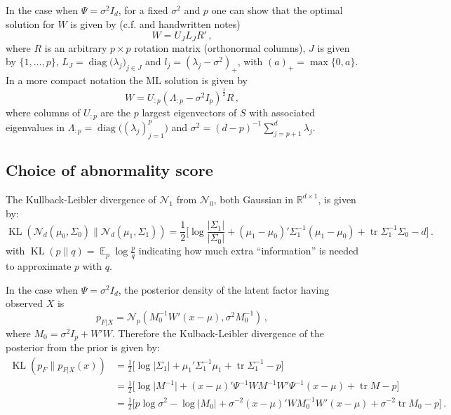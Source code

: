 \documentclass[a4paper,14pt]{article}
\newcommand{\diag}{\mathop{\text{diag}}\nolimits}
\newcommand{\Real}{\mathbb{R}}
\begin{document}
In the case when $\Psi = \sigma^2 I_d$, for a fixed $\sigma^2$ and $p$ one can show
that the optimal solution for $W$ is given by (c.f. \cite{bishop1999} and handwritten
notes)
$$ W = U_J L_J R' \,, $$
where $R$ is an arbitrary $p\times p$ rotation matrix (orthonormal columns), $J$
is given by $\{1, \ldots, p\}$, $L_J = \diag\bigl(\lambda_j\bigr)_{j\in J}$ and
$l_j = (\lambda_j - \sigma^2)_+$, with $(a)_+ = \max\{0, a\}$. In a more compact
notation the ML solution is given by
$$ W = U_{:p} (\Lambda_{:p} - \sigma^2 I_p)^\frac{1}{2} R\,,$$
where columns of $U_{:p}$ are the $p$ largest eigenvectors of $S$ with associated
eigenvalues in $\Lambda_{:p} = \diag\bigl((\lambda_j)_{j=1}^p\bigr)$ and
$\sigma^2 = (d-p)^{-1}\sum_{j=p+1}^d\lambda_j$.


\subsection{Choice of abnormality score} %
\label{sub:choice_of_abnormality_score}

The Kullback-Leibler divergence of $\mathcal{N}_1$ from $\mathcal{N}_0$, both Gaussian
in $\Real^{d\times 1}$, is given by:
$$ \mathop{\text{KL}}\nolimits(\mathcal{N}_d(\mu_0,\Sigma_0) \| \mathcal{N}_d(\mu_1,\Sigma_1))
    = \frac{1}{2}\biggl[ \log \frac{\lvert\Sigma_1\rvert}{\lvert\Sigma_0\rvert}
    + (\mu_1-\mu_0)'\Sigma_1^{-1}(\mu_1-\mu_0)
    + \mathop{\text{tr}}\nolimits\Sigma_1^{-1}\Sigma_0
    - d\biggr]
    \,.$$
with $\mathop{\text{KL}}\nolimits(p\|q)=\mathop{\mathbb{E}}\nolimits_p \log\frac{p}{q}$
indicating how much extra ``information'' is needed to approximate $p$ with $q$.

In the case when $\Psi = \sigma^2I_d$, the posterior density of the latent factor
having observed $X$ is
$$ p_{F|X} =\mathcal{N}_p(M_0^{-1}W'(x-\mu), \sigma^2 M_0^{-1}) \,,$$
where $M_0 = \sigma^2 I_p + W'W$. Therefore the Kulback-Leibler divergence of
the posterior from the prior is given by:
\begin{align*}
\mathop{\text{KL}}\nolimits(p_F\|p_{F|X}(x))
    &= \frac{1}{2}\biggl[\log \lvert \Sigma_1\rvert
    + \mu_1' \Sigma_1^{-1} \mu_1
    + \mathop{\text{tr}}\nolimits \Sigma_1^{-1}
    - p\biggr]\\
    &= \frac{1}{2}\biggl[\log \lvert M^{-1}\rvert
    + (x-\mu)'\Psi^{-1} W M^{-1} W'\Psi^{-1}(x-\mu)
    + \mathop{\text{tr}}\nolimits M
    - p\biggr]\\
    &= \frac{1}{2}\biggl[p \log \sigma^2
    - \log \lvert M_0 \rvert
    + \sigma^{-2} (x-\mu)'W M_0^{-1} W'(x-\mu)
    + \sigma^{-2} \mathop{\text{tr}}\nolimits M_0
    - p\biggr]\,.
\end{align*}
\end{document}
